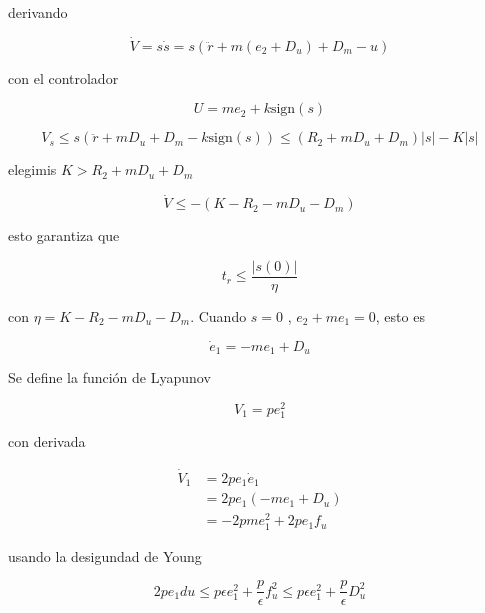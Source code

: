 derivando

\begin{equation*}
    \dot{V} = s\dot{s} = s(\ddot{r} + m(e_2+D_u)+D_m -u)
\end{equation*}

con el controlador

\begin{equation*}
    U = me_2 + k\text{sign}(s) 
\end{equation*}

\begin{equation*}
    V_s \leq s (\ddot{r} + mD_u + D_m -k\text{sign}(s)) \leq (R_2+mD_u+D_m)|s|-K|s|
\end{equation*}

elegimis \(K>R_2+mD_u+D_m\)

\begin{equation*}
    \dot{V} \leq -(K-R_2-mD_u-D_m)
\end{equation*}

esto garantiza que

\begin{equation*}
    t_r \leq \frac{|s(0)|}{\eta}
\end{equation*}

con \(\eta=K-R_2-mD_u-D_m\). Cuando $s=0$ , $e_2+me_1=0$, esto es

\begin{equation*}
    \dot{e}_1 = - me_1 + D_u
\end{equation*}

Se define la función de Lyapunov

\begin{equation*}
    V_1 = pe_1^2
\end{equation*}

con derivada

\begin{equation*}
    \begin{aligned}
        \dot{V}_1 &= 2pe_1\dot{e}_1\\
        &=2pe_1(-me_1+D_u)\\
        &=-2pme_1^2 + 2pe_1f_u
    \end{aligned}
\end{equation*}

usando la desigundad de Young

\begin{equation*}
    2pe_1du \leq p\epsilon e_1^2 + \frac{p}{\epsilon}f_u^2 \leq p\epsilon e_1^2 + \frac{p}{\epsilon}D_u^2
\end{equation*}

